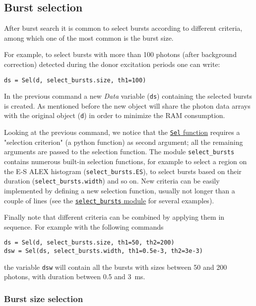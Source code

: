 \subsection{Burst selection}
\label{sec:burstsel}

After burst search it is common to select bursts according to different
criteria, among which one of the most common is the burst size.

For example, to select bursts with more than 100 photons (after background
correction) detected during the donor excitation periods one can write:

\begin{verbatim}
ds = Sel(d, select_bursts.size, th1=100)
\end{verbatim}

In the previous command a new \textit{Data} variable (\verb|ds|) containing the selected
bursts is created. As mentioned before the new object will share the photon data
arrays with the original object (\verb|d|) in order to minimize the RAM
consumption.

Looking at the previous command, we notice that the
\href{http://fretbursts.readthedocs.org/en/latest/burst\_selection.html#fretbursts.burstlib.Sel}{\texttt{Sel} function}
requires a "selection criterion" (a python function) as second
argument; all the remaining arguments are passed to the selection function. The
module \verb|select_bursts| contains numerous built-in selection functions, for
example to
select a region on the E-S ALEX histogram (\verb|select_bursts.ES|), 
to select bursts based on their duration (\verb|select_bursts.width|) and so on.
New criteria can be easily 
implemented by defining a new selection function, usually not longer than a
couple of lines (see the
\href{https://github.com/tritemio/FRETBursts/blob/master/fretbursts/select\_bursts.py}{\texttt{select\_bursts} module} for several examples).

Finally note that different criteria can be combined by applying them
in sequence. For example with the following commands

\begin{verbatim}
ds = Sel(d, select_bursts.size, th1=50, th2=200)
dsw = Sel(ds, select_bursts.width, th1=0.5e-3, th2=3e-3)
\end{verbatim}

the variable \verb|dsw| will contain all the bursts with sizes between 50 and
200 photons, with duration between 0.5 and 3~ms.

\subsubsection{Burst size selection}

